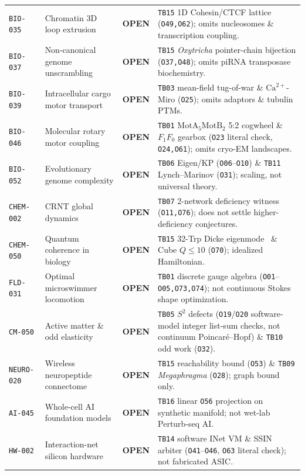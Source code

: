 \documentclass[11pt,reqno]{amsart}
\begin{document}
\begin{table}[t]
\begin{tabularx}{\textwidth}{@{}l l c L@{}}
\texttt{BIO-035} & Chromatin 3D loop extrusion & \textbf{OPEN} & \texttt{TB15} 1D Cohesin/CTCF lattice (\texttt{O49,O62}); omits nucleosomes \& transcription coupling. \\
\texttt{BIO-037} & Non-canonical genome unscrambling & \textbf{OPEN} & \texttt{TB15} \textit{Oxytricha} pointer-chain bijection (\texttt{O37,O48}); omits piRNA transposase biochemistry. \\
\texttt{BIO-039} & Intracellular cargo motor transport & \textbf{OPEN} & \texttt{TB03} mean-field tug-of-war \& $\mathrm{Ca}^{2+}$-Miro (\texttt{O25}); omits adaptors \& tubulin PTMs. \\
\texttt{BIO-046} & Molecular rotary motor coupling & \textbf{OPEN} & \texttt{TB01} $\mathrm{MotA}_5\mathrm{MotB}_2$ 5:2 cogwheel \& $F_1F_0$ gearbox (\texttt{O23} literal check, \texttt{O24,O61}); omits cryo-EM landscapes. \\
\texttt{BIO-052} & Evolutionary genome complexity & \textbf{OPEN} & \texttt{TB06} Eigen/KP (\texttt{O06}--\texttt{O10}) \& \texttt{TB11} Lynch--Marinov (\texttt{O31}); scaling, not universal theory. \\
\texttt{CHEM-002} & CRNT global dynamics & \textbf{OPEN} & \texttt{TB07} 2-network deficiency witness (\texttt{O11,O76}); does not settle higher-deficiency conjectures. \\
\texttt{CHEM-050} & Quantum coherence in biology & \textbf{OPEN} & \texttt{TB15} 32-Trp Dicke eigenmode~\cite{babcock2024ultraviolet} \& Cube $Q\le 10$ (\texttt{O70}); idealized Hamiltonian. \\
\texttt{FLD-031} & Optimal microswimmer locomotion & \textbf{OPEN} & \texttt{TB01} discrete gauge algebra (\texttt{O01}--\texttt{O05,O73,O74}); not continuous Stokes shape optimization. \\
\texttt{CM-050} & Active matter \& odd elasticity & \textbf{OPEN} & \texttt{TB05} $S^2$ defects (\texttt{O19}/\texttt{O20} software-model integer list-sum checks, not continuum Poincar\'e--Hopf) \& \texttt{TB10} odd work (\texttt{O32}). \\
\texttt{NEURO-020} & Wireless neuropeptide connectome & \textbf{OPEN} & \texttt{TB15} reachability bound (\texttt{O53}) \& \texttt{TB09} \textit{Megaphragma} (\texttt{O28}); graph bound only. \\
\texttt{AI-045} & Whole-cell AI foundation models & \textbf{OPEN} & \texttt{TB16} linear \texttt{O56} projection on synthetic manifold; not wet-lab Perturb-seq AI. \\
\texttt{HW-002} & Interaction-net silicon hardware & \textbf{OPEN} & \texttt{TB14} software INet VM \& SSIN arbiter (\texttt{O41}--\texttt{O46}, \texttt{O63} literal check); not fabricated ASIC. \\
\bottomrule
\end{tabularx}
\end{table}
\end{document}
